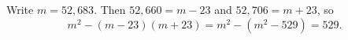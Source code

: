 Write $m=52{,}683$. Then $52{,}660=m-23$ and $52{,}706=m+23$, so
\[
m^2-(m-23)(m+23)=m^2-(m^2-529)=\boxed{529}.
\]

